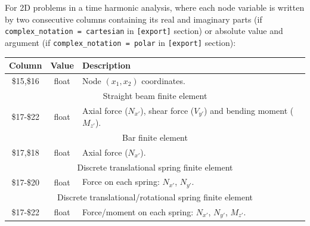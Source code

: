 \documentclass[a4paper,fleqn]{book}
\begin{document}
For 2D problems in a time harmonic analysis, where each node variable is written by two consecutive columns containing its real and imaginary parts (if \texttt{complex\_notation = cartesian} in \texttt{[export]} section) or absolute value and argument (if \texttt{complex\_notation = polar} in \texttt{[export]} section):
\begin{longtable}{ccp{11cm}}
\textbf{Column} & \textbf{Value} &\textbf{Description} \\ 
\endhead
\midrule
\$15,\$16 & float & Node $(x_1,x_2)$ coordinates. \\
\midrule
\multicolumn{3}{c}{Straight beam finite element} \\
\$17-\$22 & float & Axial force ($N_{x'}$), shear force ($V_{y'}$) and bending moment ($M_{z'}$). \\
\midrule
\multicolumn{3}{c}{Bar finite element} \\
\$17,\$18 & float & Axial force ($N_{x'}$). \\
\midrule
\multicolumn{3}{c}{Discrete translational spring finite element} \\
\$17-\$20 & float & Force on each spring: $N_{x'}$, $N_{y'}$. \\
\midrule
\multicolumn{3}{c}{Discrete translational/rotational spring finite element} \\
\$17-\$22 & float & Force/moment on each spring: $N_{x'}$, $N_{y'}$, $M_{z'}$.
\end{longtable}
\end{document}

